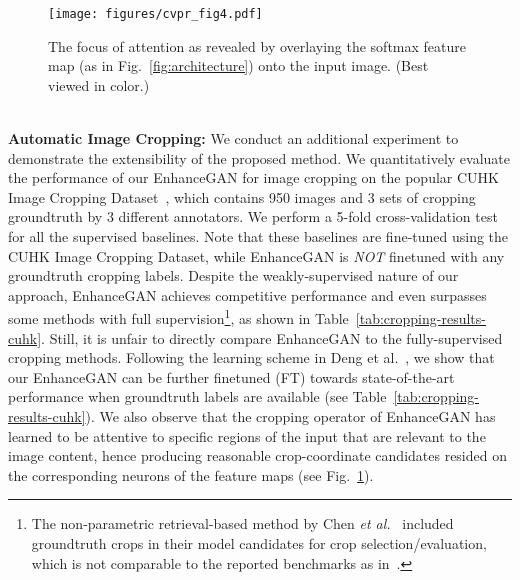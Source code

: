 \documentclass[sigconf]{acmart}
\newcommand{\etal}{\textit{et al.}}
\begin{document}
\begin{figure}[t]
\begin{center}
\texttt{[image: figures/cvpr\_fig4.pdf]}
\end{center}
\vskip -0.4cm
\caption{The focus of attention as revealed by overlaying the softmax feature map (as in Fig.~\ref{fig:architecture}) onto the input image. (Best viewed in color.)}
\label{fig:cropping_response}
\vskip -0.4cm
\end{figure}
\vspace{0.1cm}
\\
\noindent\textbf{Automatic Image Cropping:} We conduct an additional experiment to demonstrate the extensibility of the proposed method.
We quantitatively evaluate the performance of our EnhanceGAN for image cropping on the popular CUHK Image Cropping Dataset~\cite{yan2013learning}, which contains 950 images and 3 sets of cropping groundtruth by 3 different annotators. 
We perform a 5-fold cross-validation test for all the supervised baselines. Note that these baselines are fine-tuned using the CUHK Image Cropping Dataset, while EnhanceGAN is \textit{NOT} finetuned with any groundtruth cropping labels. Despite the weakly-supervised nature of our approach, EnhanceGAN achieves competitive performance and even surpasses some methods with full supervision\footnote{\color{black}The non-parametric retrieval-based method by Chen \etal~\cite{chen2017learning} included groundtruth crops in their model candidates for crop selection/evaluation, which is not comparable to the reported benchmarks as in~\cite{yan2013learning,chen2017quantitative,deng2017image}.\color{black}}, as shown in Table~\ref{tab:cropping-results-cuhk}. 
\color{black} Still, it is unfair to directly compare EnhanceGAN to the fully-supervised cropping methods. Following the learning scheme in Deng et al.~\cite{deng2017image}, we show that our EnhanceGAN can be further finetuned (FT) towards state-of-the-art performance when groundtruth labels are available (see Table~\ref{tab:cropping-results-cuhk}).
\color{black}
We also observe that the cropping operator of EnhanceGAN has learned to be attentive to specific regions of the input that are relevant to the image content, hence producing reasonable crop-coordinate candidates resided on the corresponding neurons of the feature maps (see Fig.~\ref{fig:cropping_response}). 
\end{document}
